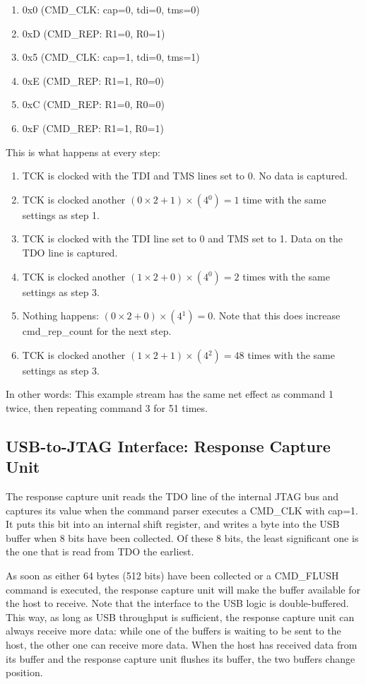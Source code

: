 \documentclass[main\_\_EN.tex]{subfiles}
\begin{document}
\begin{enumerate}
\item 0x0 (CMD\_CLK: cap=0, tdi=0, tms=0)
\item 0xD (CMD\_REP: R1=0, R0=1)
\item 0x5 (CMD\_CLK: cap=1, tdi=0, tms=1)
\item 0xE (CMD\_REP: R1=1, R0=0)
\item 0xC (CMD\_REP: R1=0, R0=0)
\item 0xF (CMD\_REP: R1=1, R0=1)
\end{enumerate}


This is what happens at every step:
\begin{enumerate}
\item TCK is clocked with the TDI and TMS lines set to 0. No data is captured.
\item TCK is clocked another \((0\times2+1)\times(4{^0})=1\) time with the same settings as step 1.
\item TCK is clocked with the TDI line set to 0 and TMS set to 1. Data on the TDO line is captured.
\item TCK is clocked another \((1\times2+0)\times(4{^0})=2\) times with the same settings as step 3.
\item Nothing happens: \((0\times2+0)\times(4{^1})=0\). Note that this does increase cmd\_rep\_count for the next step.
\item TCK is clocked another \((1\times2+1)\times(4{^2})=48\) times with the same settings as step 3.
\end{enumerate}

In other words: This example stream has the same net effect as command 1 twice, then repeating command 3 for 51 times.

\subsection{USB-to-JTAG Interface: Response Capture Unit}

The response capture unit reads the TDO line of the internal JTAG bus and captures its value when the command parser executes a CMD\_CLK with cap=1. It puts this bit into an internal shift register, and writes a byte into the USB buffer when 8 bits have been collected. Of these 8 bits, the least significant one is the one that is read from TDO the earliest.

As soon as either 64 bytes (512 bits) have been collected or a CMD\_FLUSH command is executed, the response capture unit will make the buffer available for the host to receive. Note that the interface to the USB logic is double-buffered. This way, as long as USB throughput is sufficient, the response capture unit can always receive more data: while one of the buffers is waiting to be sent to the host, the other one can receive more data. When the host has received data from its buffer and the response capture unit flushes its buffer, the two buffers change position.
\end{document}
